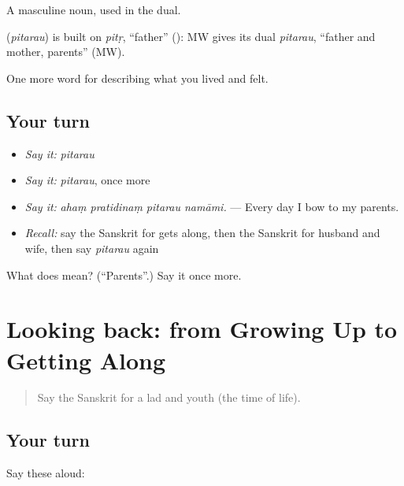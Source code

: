 A masculine noun, used in the dual.

\begin{cousinweb}
\textbf{} (\emph{pitarau}) is built on \emph{pitṛ}, \textquotedblleft{}father\textquotedblright{} (\textbf{}): MW gives its dual \emph{pitarau}, \textquotedblleft{}father and mother, parents\textquotedblright{} (MW).
\end{cousinweb}

\begin{grammarlens}[title={What you've built}]
One more word for describing what you lived and felt.
\end{grammarlens}

\subsection*{Your turn}
\begin{itemize}
\raggedright
  \item \emph{Say it:} \emph{pitarau}
  \item \emph{Say it:} \emph{pitarau}, once more
  \item \emph{Say it:} \emph{ahaṃ pratidinaṃ pitarau namāmi.} — Every day I bow to my parents.
  \item \emph{Recall:} say the Sanskrit for gets along, then the Sanskrit for husband and wife, then say \emph{pitarau} again
\end{itemize}

\begin{tcolorbox}[breakable,colback=teal!4,colframe=teal!35!black,title={Before you move on}]
What does  mean? (\textquotedblleft{}Parents\textquotedblright{}.) Say it once more.
\end{tcolorbox}
\section[(dialogue)]{Looking back: from Growing Up to Getting Along}

\label{lesson:SA-R501-review-495-501}



\begin{quote}
Say the Sanskrit for a lad and youth (the time of life).
\end{quote}

\subsection*{Your turn}
Say these aloud:

